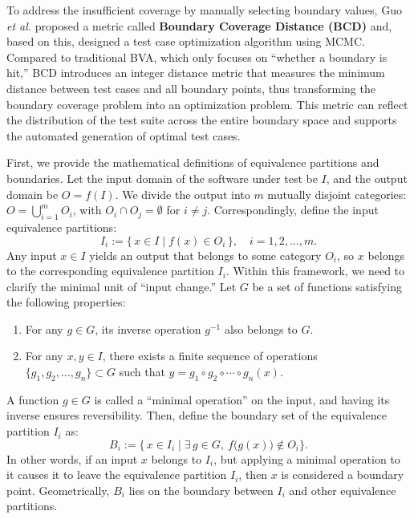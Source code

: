 \documentclass[manuscript,screen,review]{acmart}
\begin{document}
To address the insufficient coverage by manually selecting boundary values, Guo \textit{et al.}\cite{Guo2024} proposed a metric called \textbf{Boundary Coverage Distance (BCD)} and, based on this, designed a test case optimization algorithm using MCMC. Compared to traditional BVA, which only focuses on ``whether a boundary is hit,'' BCD introduces an integer distance metric that measures the minimum distance between test cases and all boundary points, thus transforming the boundary coverage problem into an optimization problem. This metric can reflect the distribution of the test suite across the entire boundary space and supports the automated generation of optimal test cases.

First, we provide the mathematical definitions of equivalence partitions and boundaries. Let the input domain of the software under test be $I$, and the output domain be $O = f(I)$. We divide the output into $m$ mutually disjoint categories: $O = \bigcup_{i=1}^m O_i$, with $O_i \cap O_j = \emptyset$ for $i \neq j$. Correspondingly, define the input equivalence partitions:
\begin{equation}
I_i := \{\, x \in I \mid f(x) \in O_i \,\}, \quad i = 1,2,\ldots,m. \tag{1}
\end{equation}
Any input $x \in I$ yields an output that belongs to some category $O_i$, so $x$ belongs to the corresponding equivalence partition $I_i$. Within this framework, we need to clarify the minimal unit of ``input change.'' Let $G$ be a set of functions satisfying the following properties:
\begin{enumerate}
  \item For any $g \in G$, its inverse operation $g^{-1}$ also belongs to $G$.
  \item For any $x,y \in I$, there exists a finite sequence of operations $\{g_1, g_2, \ldots, g_n\} \subset G$ such that $y = g_1 \circ g_2 \circ \cdots \circ g_n(x)$.
\end{enumerate}
A function $g \in G$ is called a ``minimal operation'' on the input, and having its inverse ensures reversibility. Then, define the boundary set of the equivalence partition $I_i$ as:
\begin{equation}
B_i := \bigl\{\, x \in I_i \mid \exists\, g \in G,\ f\bigl(g(x)\bigr) \notin O_i \bigr\}. \tag{2}
\end{equation}
In other words, if an input $x$ belongs to $I_i$, but applying a minimal operation to it causes it to leave the equivalence partition $I_i$, then $x$ is considered a boundary point. Geometrically, $B_i$ lies on the boundary between $I_i$ and other equivalence partitions.
\end{document}

